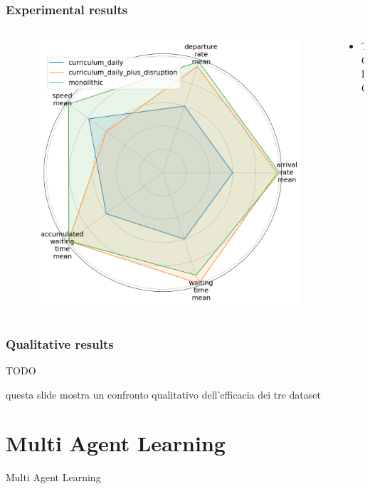 \documentclass[dvipsnames]{beamer}
\begin{document}
\begin{frame}
\frametitle{Experimental results}
  \begin{columns}
  \begin{column}{0.5\textwidth}
    \begin{figure}
      \centering
      \includegraphics[width=1.0\textwidth]{figures/dataset-radar.png}
    \end{figure}
  \end{column}
  \begin{column}{0.5\textwidth}
    \begin{itemize}
      \item TODO
    \end{itemize}
  \end{column}
\end{columns}
\end{frame}

\begin{frame}
\frametitle{Qualitative results}
TODO

questa slide mostra un confronto qualitativo dell'efficacia dei tre dataset
\end{frame}

\section{Multi Agent Learning}
\begin{frame}
\centering
\Huge
Multi Agent Learning
\end{frame}
\end{document}
